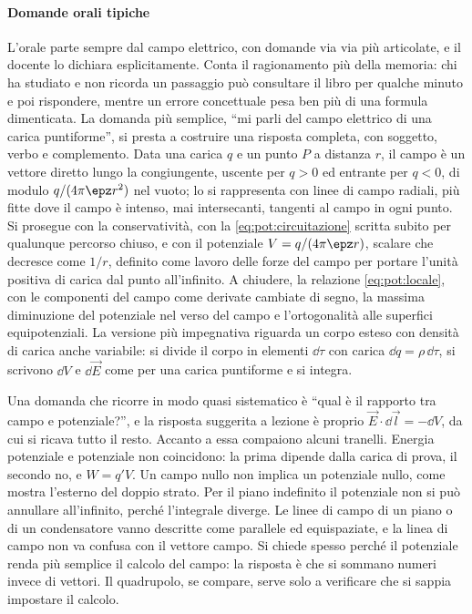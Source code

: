 \documentclass[main.tex]{subfiles}
\begin{document}
	\paragraph*{Domande orali tipiche}
	L'orale parte sempre dal campo elettrico, con domande via via più articolate, e il docente lo dichiara esplicitamente. Conta il ragionamento più della memoria: chi ha studiato e non ricorda un passaggio può consultare il libro per qualche minuto e poi rispondere, mentre un errore concettuale pesa ben più di una formula dimenticata. La domanda più semplice, \enquote{mi parli del campo elettrico di una carica puntiforme}, si presta a costruire una risposta completa, con soggetto, verbo e complemento. Data una carica $q$ e un punto $P$ a distanza $r$, il campo è un vettore diretto lungo la congiungente, uscente per $q>0$ ed entrante per $q<0$, di modulo $q/(4\pi\epz r^2)$ nel vuoto; lo si rappresenta con linee di campo radiali, più fitte dove il campo è intenso, mai intersecanti, tangenti al campo in ogni punto. Si prosegue con la conservatività, con la \eqref{eq:pot:circuitazione} scritta subito per qualunque percorso chiuso, e con il potenziale $V=q/(4\pi\epz r)$, scalare che decresce come $1/r$, definito come lavoro delle forze del campo per portare l'unità positiva di carica dal punto all'infinito. A chiudere, la relazione \eqref{eq:pot:locale}, con le componenti del campo come derivate cambiate di segno, la massima diminuzione del potenziale nel verso del campo e l'ortogonalità alle superfici equipotenziali. La versione più impegnativa riguarda un corpo esteso con densità di carica anche variabile: si divide il corpo in elementi $\dd\tau$ con carica $\dd q=\rho\,\dd\tau$, si scrivono $\dd V$ e $\dd\vec E$ come per una carica puntiforme e si integra.
	
	Una domanda che ricorre in modo quasi sistematico è \enquote{qual è il rapporto tra campo e potenziale?}, e la risposta suggerita a lezione è proprio $\vec E\cdot\dd\vec l=-\dd V$, da cui si ricava tutto il resto. Accanto a essa compaiono alcuni tranelli. Energia potenziale e potenziale non coincidono: la prima dipende dalla carica di prova, il secondo no, e $W=q'V$. Un campo nullo non implica un potenziale nullo, come mostra l'esterno del doppio strato. Per il piano indefinito il potenziale non si può annullare all'infinito, perché l'integrale diverge. Le linee di campo di un piano o di un condensatore vanno descritte come parallele ed equispaziate, e la linea di campo non va confusa con il vettore campo. Si chiede spesso perché il potenziale renda più semplice il calcolo del campo: la risposta è che si sommano numeri invece di vettori. Il quadrupolo, se compare, serve solo a verificare che si sappia impostare il calcolo.
	
\end{document}
